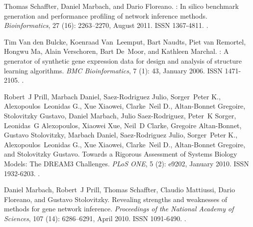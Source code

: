 \documentclass[10pt, a4paper]{article}
\begin{document}
\begin{thebibliography}{59}
	Thomas Schaffter, Daniel Marbach, and Dario Floreano.
	: In silico benchmark generation and performance
	profiling of network inference methods.
	\newblock \emph{Bioinformatics}, 27 (16): 2263--2270, August
	2011.
	\newblock ISSN 1367-4811.
	\newblock {}.
	
	Tim {Van den Bulcke}, Koenraad Van~Leemput, Bart Naudts, Piet {van Remortel},
	Hongwu Ma, Alain Verschoren, Bart De~Moor, and Kathleen Marchal.
	: A generator of synthetic gene expression data for design
	and analysis of structure learning algorithms.
	\newblock \emph{BMC Bioinformatics}, 7 (1): 43, January 2006.
	\newblock ISSN 1471-2105.
	\newblock {}.
	
	Robert~J Prill, Marbach Daniel, Saez-Rodriguez Julio, Sorger~Peter K.,
	Alexopoulos~Leonidas G., Xue Xiaowei, Clarke~Neil D., Altan-Bonnet Gregoire,
	Stolovitzky Gustavo, Daniel Marbach, Julio {Saez-Rodriguez}, Peter~K Sorger,
	Leonidas~G Alexopoulos, Xiaowei Xue, Neil~D Clarke, Gregoire {Altan-Bonnet},
	Gustavo Stolovitzky, Marbach Daniel, Saez-Rodriguez Julio, Sorger~Peter K.,
	Alexopoulos~Leonidas G., Xue Xiaowei, Clarke~Neil D., Altan-Bonnet Gregoire,
	and Stolovitzky Gustavo.
	\newblock Towards a {{Rigorous Assessment}} of {{Systems Biology Models}}:
	{{The DREAM3 Challenges}}.
	\newblock \emph{PLoS ONE}, 5 (2): e9202, January 2010.
	\newblock ISSN 1932-6203.
	\newblock {}.
	
	Daniel Marbach, Robert~J Prill, Thomas Schaffter, Claudio Mattiussi, Dario
	Floreano, and Gustavo Stolovitzky.
	\newblock Revealing strengths and weaknesses of methods for gene network
	inference.
	\newblock \emph{Proceedings of the National Academy of Sciences}, 107
	(14): 6286--6291, April 2010.
	\newblock ISSN 1091-6490.
	\newblock {}.
	

\end{thebibliography}
\end{document}
